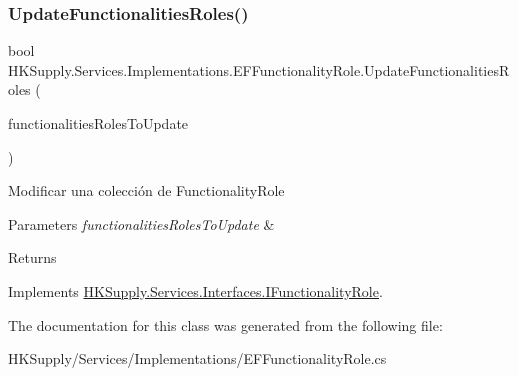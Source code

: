 \subsubsection{\texorpdfstring{Update\+Functionalities\+Roles()}{UpdateFunctionalitiesRoles()}}
{\footnotesize\ttfamily bool H\+K\+Supply.\+Services.\+Implementations.\+E\+F\+Functionality\+Role.\+Update\+Functionalities\+Roles (\begin{DoxyParamCaption}\item[{I\+Enumerable$<$ \mbox{\hyperlink{class_h_k_supply_1_1_models_1_1_functionality_role}{Functionality\+Role}} $>$}]{functionalities\+Roles\+To\+Update }\end{DoxyParamCaption})}



Modificar una colección de Functionality\+Role 


\begin{DoxyParams}{Parameters}
{\em functionalities\+Roles\+To\+Update} & \\
\hline
\end{DoxyParams}
\begin{DoxyReturn}{Returns}

\end{DoxyReturn}


Implements \mbox{\hyperlink{interface_h_k_supply_1_1_services_1_1_interfaces_1_1_i_functionality_role}{H\+K\+Supply.\+Services.\+Interfaces.\+I\+Functionality\+Role}}.



The documentation for this class was generated from the following file\+:\begin{DoxyCompactItemize}
\item 
H\+K\+Supply/\+Services/\+Implementations/E\+F\+Functionality\+Role.\+cs\end{DoxyCompactItemize}
